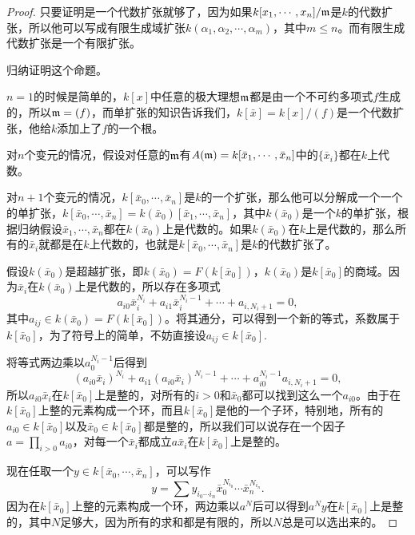 \documentclass[9pt]{extbook}
\theoremstyle{plain}%
\begin{document}
\begin{proof}
	只要证明是一个代数扩张就够了，因为如果$k[x_1,\cdots,x_n]/\mathfrak{m}$是$k$的代数扩张，所以他可以写成有限生成域扩张$k(\alpha_1,\alpha_2,\cdots,\alpha_m)$，其中$m\leq n$。而有限生成代数扩张是一个有限扩张。

	归纳证明这个命题。

	$n=1$的时候是简单的，$k[x]$中任意的极大理想$\mathfrak{m}$都是由一个不可约多项式$f$生成的，所以$\mathfrak{m}=(f)$，而单扩张的知识告诉我们，$k[\bar{x}]=k[x]/(f)$是一个代数扩张，他给$k$添加上了$f$的一个根。

	对$n$个变元的情况，假设对任意的$\mathfrak{m}$有$A(\mathfrak{m})=k[\bar{x}_1,\cdots,\bar{x}_n]$中的$\{\bar{x}_i\}$都在$k$上代数。

	对$n+1$个变元的情况，$k[\bar{x}_0,\cdots,\bar{x}_{n}]$是$k$的一个扩张，那么他可以分解成一个一个的单扩张，$k[\bar{x}_0,\cdots,\bar{x}_{n}]=k(\bar{x}_0)[\bar{x}_1,\cdots,\bar{x}_{n}]$，其中$k(\bar{x}_0)$是一个$k$的单扩张，根据归纳假设$\bar{x}_1,\cdots,\bar{x}_{n}$都在$k(\bar{x}_0)$上是代数的。如果$k(\bar{x}_0)$在$k$上是代数的，那么所有的$\bar{x}_i$就都是在$k$上代数的，也就是$k[\bar{x}_0,\cdots,\bar{x}_{n}]$是$k$的代数扩张了。

	假设$k(\bar{x}_0)$是超越扩张，即$k(\bar{x}_0)=F(k[\bar{x}_0])$，$k(\bar{x}_0)$是$k[\bar{x}_0]$的商域。因为$\bar{x}_i$在$k(\bar{x}_0)$上是代数的，所以存在多项式
	\[
		a_{i0}\bar{x}_i^{N_i}+a_{i1}\bar{x}_i^{N_i-1}+\cdots +a_{i,N_i+1}=0,
	\]
	其中$a_{ij}\in k(\bar{x}_0)=F(k[\bar{x}_0])$。将其通分，可以得到一个新的等式，系数属于$k[\bar{x}_0]$，为了符号上的简单，不妨直接设$a_{ij}\in k[\bar{x}_0]$.

	将等式两边乘以$a_0^{N_i-1}$后得到
	\[
		(a_{i0}\bar{x}_i)^{N_i}+a_{i1}(a_{i0}\bar{x}_i)^{N_i-1}+\cdots +a_{i0}^{N_i-1}a_{i,N_i+1}=0,
	\]
	所以$a_{i0}\bar{x}_i$在$k[\bar{x}_0]$上是整的，对所有的$i>0$和$\bar{x}_0$都可以找到这么一个$a_{i0}$。由于在$k[\bar{x}_0]$上整的元素构成一个环，而且$k[\bar{x}_0]$是他的一个子环，特别地，所有的$a_{i0}\in k[\bar{x}_0]$以及$\bar{x}_0\in k[\bar{x}_0]$都是整的，所以我们可以说存在一个因子$a=\prod_{i>0}a_{i0}$，对每一个$\bar{x}_i$都成立$a\bar{x}_i$在$k[\bar{x}_0]$上是整的。

	现在任取一个$y\in k[\bar{x}_0,\cdots,\bar{x}_n]$，可以写作
	\[
		y=\sum y_{i_0 \cdots i_n}\bar{x}_0^{N_{i_0}}\cdots\bar{x}_{n}^{N_{i_n}}.
	\]
	因为在$k[\bar{x}_0]$上整的元素构成一个环，两边乘以$a^N$后可以得到$a^Ny$在$k[\bar{x}_0]$上是整的，其中$N$足够大，因为所有的求和都是有限的，所以$N$总是可以选出来的。


\end{proof}
\end{document}
